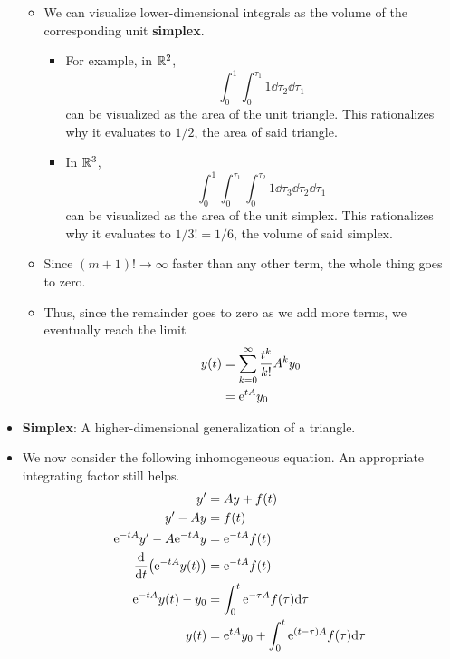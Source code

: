 \documentclass[../notes.tex]{subfiles}
\begin{document}
\begin{itemize}
\begin{itemize}
\begin{itemize}
        \end{itemize}
        \item We can visualize lower-dimensional integrals as the volume of the corresponding unit \textbf{simplex}.
        \begin{itemize}
            \item For example, in $\R^2$,
            \begin{equation*}
                \int_0^1\int_0^{\tau_1}1\dd\tau_2\dd{\tau_1}
            \end{equation*}
            can be visualized as the area of the unit triangle. This rationalizes why it evaluates to $1/2$, the area of said triangle.
            \item In $\R^3$,
            \begin{equation*}
                \int_0^1\int_0^{\tau_1}\int_0^{\tau_2}1\dd\tau_3\dd\tau_2\dd{\tau_1}
            \end{equation*}
            can be visualized as the area of the unit simplex. This rationalizes why it evaluates to $1/3!=1/6$, the volume of said simplex.
        \end{itemize}
        \item Since $(m+1)!\to\infty$ faster than any other term, the whole thing goes to zero.
        \item Thus, since the remainder goes to zero as we add more terms, we eventually reach the limit
        \begin{align*}
            y(t) &= \sum_{k=0}^\infty\frac{t^k}{k!}A^ky_0\\
            &= \e[tA]y_0
        \end{align*}
    \end{itemize}
    \item \textbf{Simplex}: A higher-dimensional generalization of a triangle.
    \item We now consider the following inhomogeneous equation. An appropriate integrating factor still helps.
    \begin{align*}
        y' &= Ay+f(t)\\
        y'-Ay &= f(t)\\
        \e[-tA]y'-A\e[-tA]y &= \e[-tA]f(t)\\
        \dv{t}(\e[-tA]y(t)) &= \e[-tA]f(t)\\
        \e[-tA]y(t)-y_0 &= \int_0^t\e[-\tau A]f(\tau)\dd\tau\\
        y(t) &= \e[tA]y_0+\int_0^t\e[(t-\tau)A]f(\tau)\dd\tau
    \end{align*}

\end{itemize}
\end{document}
